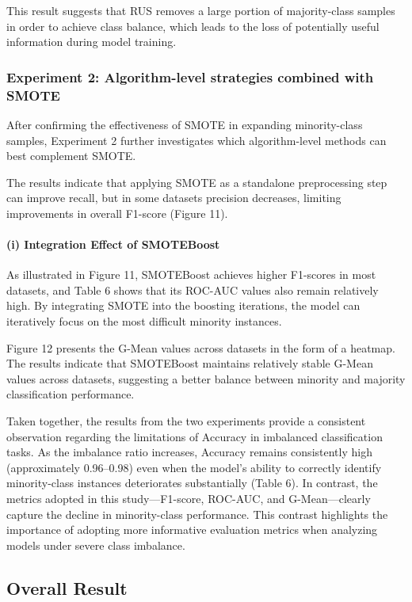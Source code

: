 \documentclass[sigconf]{acmart}
\begin{document}
This result suggests that RUS removes a large portion of majority-class samples in order to achieve class balance, which leads to the loss of potentially useful information during model training. 

\subsubsection{Experiment 2: Algorithm-level strategies combined with SMOTE}

After confirming the effectiveness of SMOTE in expanding minority-class samples, Experiment 2 further investigates which algorithm-level methods can best complement SMOTE.  

The results indicate that applying SMOTE as a standalone preprocessing step can improve recall, but in some datasets precision decreases, limiting improvements in overall F1-score (Figure 11).  

\paragraph{(i) Integration Effect of SMOTEBoost}

As illustrated in Figure 11, SMOTEBoost achieves higher F1-scores in most datasets, and Table 6 shows that its ROC-AUC values also remain relatively high. By integrating SMOTE into the boosting iterations, the model can iteratively focus on the most difficult minority instances.  

Figure 12 presents the G-Mean values across datasets in the form of a heatmap. The results indicate that SMOTEBoost maintains relatively stable G-Mean values across datasets, suggesting a better balance between minority and majority classification performance. 

Taken together, the results from the two experiments provide a consistent observation regarding the limitations of Accuracy in imbalanced classification tasks. As the imbalance ratio increases, Accuracy remains consistently high (approximately 0.96–0.98) even when the model’s ability to correctly identify minority-class instances deteriorates substantially (Table 6). In contrast, the metrics adopted in this study—F1-score, ROC-AUC, and G-Mean—clearly capture the decline in minority-class performance. This contrast highlights the importance of adopting more informative evaluation metrics when analyzing models under severe class imbalance. 

\subsection{Overall Result}
\end{document}
